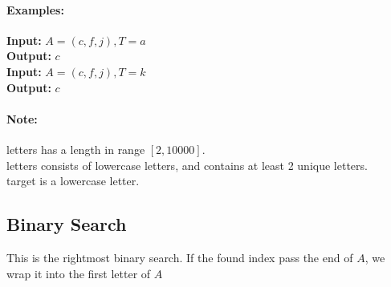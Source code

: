 \documentclass[a4paper,12pt]{article}
\begin{document}
\paragraph{Examples:}
\begin{flushleft}
\textbf{Input:} $A=(c,f,j), T=a$
\\
\textbf{Output:} $c$
\\
\textbf{Input:} $A=(c,f,j), T=k$
\\
\textbf{Output:} $c$
\end{flushleft}
\paragraph{Note:}
\begin{flushleft}
letters has a length in range $[2, 10000]$.
\\
letters consists of lowercase letters, and contains at least 2 unique letters.
\\
target is a lowercase letter.
\end{flushleft}
\subsection{Binary Search}
This is the rightmost binary search. If the found index pass the end of $A$, we wrap it into the first letter of $A$
\end{document}

